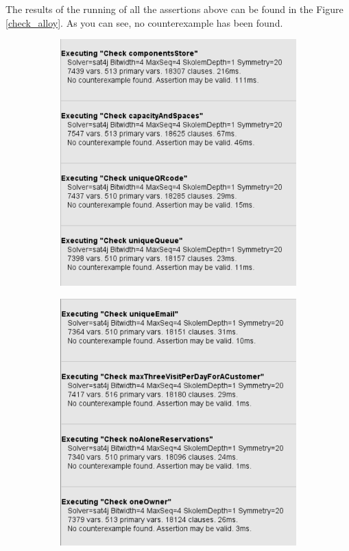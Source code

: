 \documentclass[a4paper, 10pt, oneside]{article}
\begin{document}
The results of the running of all the assertions above can be found in the Figure \ref{check_alloy}. As you can see, no counterexample has been found.

\begin{figure}[hbt]
\centering
\begin{subfigure}
	\centering
  	\includegraphics[height=0.3\textheight, scale=0.2, keepaspectratio]{img/alloy/img_check_1.PNG}
 \end{subfigure}
 \begin{subfigure}
	\centering
  	\includegraphics[height=0.3\textheight, scale=0.2, keepaspectratio]{img/alloy/img_check_2.PNG}

\end{subfigure}
\end{figure}
\end{document}
